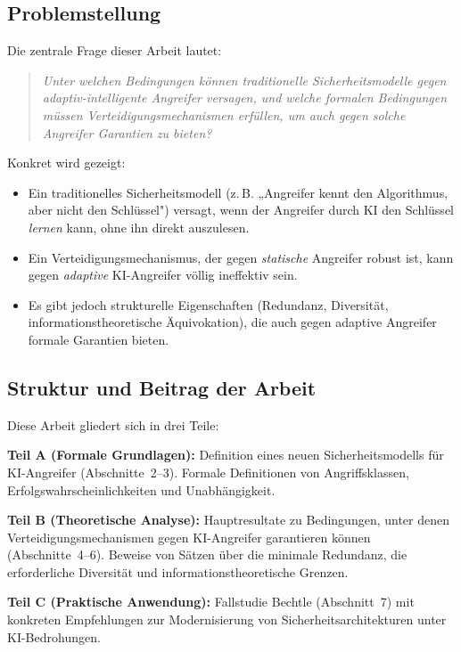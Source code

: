 \documentclass[a4paper,12pt]{article}
\theoremstyle{definition}
\begin{document}
\subsection{Problemstellung}

Die zentrale Frage dieser Arbeit lautet:

\begin{quote}
	\textit{Unter welchen Bedingungen können traditionelle Sicherheitsmodelle gegen adaptiv-intelligente Angreifer versagen, und welche formalen Bedingungen müssen Verteidigungsmechanismen erfüllen, um auch gegen solche Angreifer Garantien zu bieten?}
\end{quote}

Konkret wird gezeigt:

\begin{itemize}
	\item Ein traditionelles Sicherheitsmodell (z.\,B. „Angreifer kennt den Algorithmus, aber nicht den Schlüssel") versagt, wenn der Angreifer durch KI den Schlüssel \emph{lernen} kann, ohne ihn direkt auszulesen.
	\item Ein Verteidigungsmechanismus, der gegen \emph{statische} Angreifer robust ist, kann gegen \emph{adaptive} KI-Angreifer völlig ineffektiv sein.
	\item Es gibt jedoch strukturelle Eigenschaften (Redundanz, Diversität, informationstheoretische Äquivokation), die auch gegen adaptive Angreifer formale Garantien bieten.
\end{itemize}

\subsection{Struktur und Beitrag der Arbeit}

Diese Arbeit gliedert sich in drei Teile:

\textbf{Teil A (Formale Grundlagen):} Definition eines neuen Sicherheitsmodells für KI-Angreifer (Abschnitte~2--3). Formale Definitionen von Angriffsklassen, Erfolgswahrscheinlichkeiten und Unabhängigkeit.

\textbf{Teil B (Theoretische Analyse):} Hauptresultate zu Bedingungen, unter denen Verteidigungsmechanismen gegen KI-Angreifer garantieren können (Abschnitte~4--6). Beweise von Sätzen über die minimale Redundanz, die erforderliche Diversität und informationstheoretische Grenzen.

\textbf{Teil C (Praktische Anwendung):} Fallstudie Bechtle (Abschnitt~7) mit konkreten Empfehlungen zur Modernisierung von Sicherheitsarchitekturen unter KI-Bedrohungen.
\end{document}
